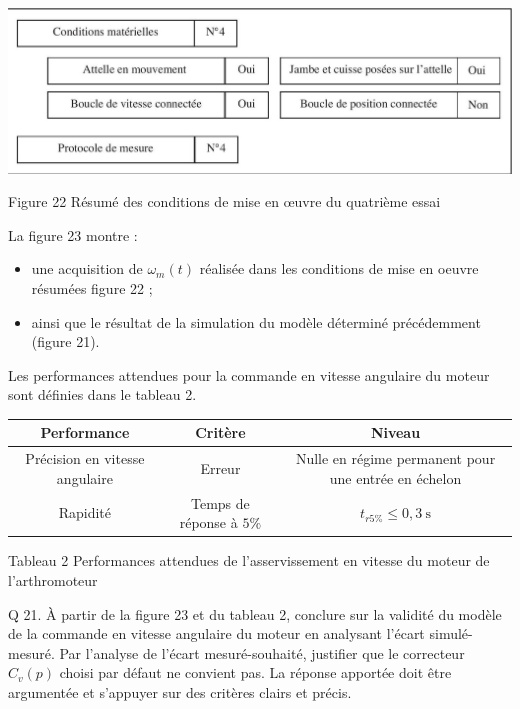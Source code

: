 \documentclass[10pt]{article}
\begin{document}
\begin{center}
\includegraphics[max width=\textwidth]{2024_07_14_a83aebba33898893d39fg-13(1)}
\end{center}

Figure 22 Résumé des conditions de mise en œuvre du quatrième essai

La figure 23 montre :

\begin{itemize}
  \item une acquisition de $\omega_{m}(t)$ réalisée dans les conditions de mise en oeuvre résumées figure 22 ;

  \item ainsi que le résultat de la simulation du modèle déterminé précédemment (figure 21).

\end{itemize}

Les performances attendues pour la commande en vitesse angulaire du moteur sont définies dans le tableau 2.

\begin{center}
\begin{tabular}{|c|c|c|}
\hline
Performance & Critère & Niveau \\
\hline
Précision en vitesse angulaire & Erreur & Nulle en régime permanent pour une entrée en échelon \\
\hline
Rapidité & Temps de réponse à $5 \%$ & $t_{r 5 \%} \leqslant 0,3 \mathrm{~s}$ \\
\hline
\end{tabular}
\end{center}

Tableau 2 Performances attendues de l'asservissement en vitesse du moteur de l'arthromoteur

Q 21. À partir de la figure 23 et du tableau 2, conclure sur la validité du modèle de la commande en vitesse angulaire du moteur en analysant l'écart simulé-mesuré. Par l'analyse de l'écart mesuré-souhaité, justifier que le correcteur $C_{v}(p)$ choisi par défaut ne convient pas. La réponse apportée doit être argumentée et s'appuyer sur des critères clairs et précis.
\end{document}
